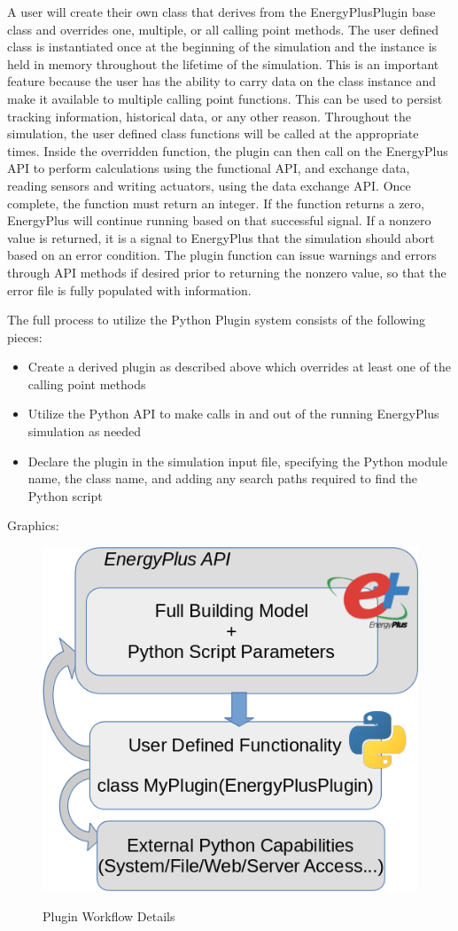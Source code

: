 \documentclass[5p, authoryear]{elsarticle}
\begin{document}
A user will create their own class that derives from the EnergyPlusPlugin base class and overrides one, multiple, or all calling point methods.  The user defined class is instantiated once at the beginning of the simulation and the instance is held in memory throughout the lifetime of the simulation.  This is an important feature because the user has the ability to carry data on the class instance and make it available to multiple calling point functions.  This can be used to persist tracking information, historical data, or any other reason.  Throughout the simulation, the user defined class functions will be called at the appropriate times.  Inside the overridden function, the plugin can then call on the EnergyPlus API to perform calculations using the functional API, and exchange data, reading sensors and writing actuators, using the data exchange API.  Once complete, the function must return an integer.  If the function returns a zero, EnergyPlus will continue running based on that successful signal.  If a nonzero value is returned, it is a signal to EnergyPlus that the simulation should abort based on an error condition.  The plugin function can issue warnings and errors through API methods if desired prior to returning the nonzero value, so that the error file is fully populated with information.

The full process to utilize the Python Plugin system consists of the following pieces:
\begin{itemize}
 \item Create a derived plugin as described above which overrides at least one of the calling point methods
 \item Utilize the Python API to make calls in and out of the running EnergyPlus simulation as needed
 \item Declare the plugin in the simulation input file, specifying the Python module name, the class name, and adding any search paths required to find the Python script
\end{itemize}

Graphics:

\begin{figure}
\begin{center}
\label{figure:plugins:plugin_workflow_cropped}
\includegraphics[width=0.7\columnwidth]{images/plugin_workflow.png}
\caption{Plugin Workflow Details}
\end{center}
\end{figure}
\end{document}
